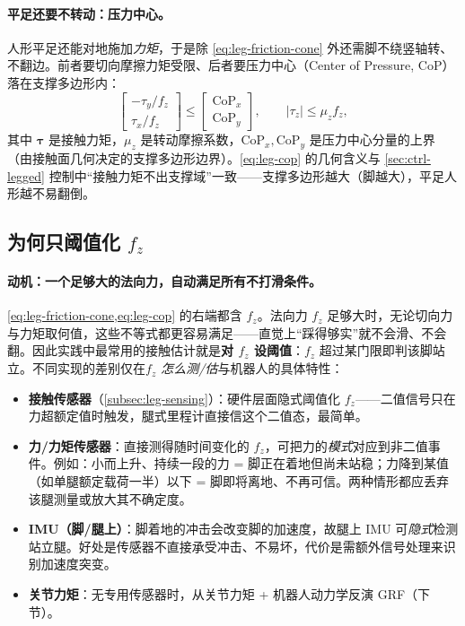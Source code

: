 \paragraph{平足还要不转动：压力中心。}
人形平足还能对地施加\emph{力矩}，于是除 \cref{eq:leg-friction-cone} 外还需脚不绕竖轴转、不翻边。前者要切向摩擦力矩受限、后者要压力中心（Center of Pressure, CoP）落在支撑多边形内：
\begin{equation}
  \begin{bmatrix}-\tau_y/f_z\\\tau_x/f_z\end{bmatrix}\le\begin{bmatrix}\mathrm{CoP}_x\\\mathrm{CoP}_y\end{bmatrix},\qquad |\tau_z|\le\mu_z f_z,
  \label{eq:leg-cop}
\end{equation}
其中 $\boldsymbol{\tau}$ 是接触力矩，$\mu_z$ 是转动摩擦系数，$\mathrm{CoP}_{x},\mathrm{CoP}_{y}$ 是压力中心分量的上界（由接触面几何决定的支撑多边形边界）。\cref{eq:leg-cop} 的几何含义与 \cref{sec:ctrl-legged} 控制中“接触力矩不出支撑域”一致——支撑多边形越大（脚越大），平足人形越不易翻倒。

\subsection{为何只阈值化 \texorpdfstring{$f_z$}{f_z}}
\label{subsec:leg-fz}

\paragraph{动机：一个足够大的法向力，自动满足所有不打滑条件。}
\cref{eq:leg-friction-cone,eq:leg-cop} 的右端都含 $f_z$。法向力 $f_z$ 足够大时，无论切向力与力矩取何值，这些不等式都更容易满足——直觉上“踩得够实”就不会滑、不会翻。因此实践中最常用的接触估计就是\textbf{对 $f_z$ 设阈值}：$f_z$ 超过某门限即判该脚站立。不同实现的差别仅在\emph{$f_z$ 怎么测/估}与机器人的具体特性：
\begin{itemize}
  \item \textbf{接触传感器}（\cref{subsec:leg-sensing}）：硬件层面隐式阈值化 $f_z$——二值信号只在力超额定值时触发，腿式里程计直接信这个二值态，最简单。
  \item \textbf{力/力矩传感器}：直接测得随时间变化的 $f_z$，可把力的\emph{模式}对应到非二值事件。例如：小而上升、持续一段的力 = 脚正在着地但尚未站稳；力降到某值（如单腿额定载荷一半）以下 = 脚即将离地、不再可信。两种情形都应丢弃该腿测量或放大其不确定度\cite{carlone2026handbook}。
  \item \textbf{IMU（脚/腿上）}：脚着地的冲击会改变脚的加速度，故腿上 IMU 可\emph{隐式}检测站立腿。好处是传感器不直接承受冲击、不易坏，代价是需额外信号处理来识别加速度突变。
  \item \textbf{关节力矩}：无专用传感器时，从关节力矩 + 机器人动力学反演 GRF（下节）。
\end{itemize}

